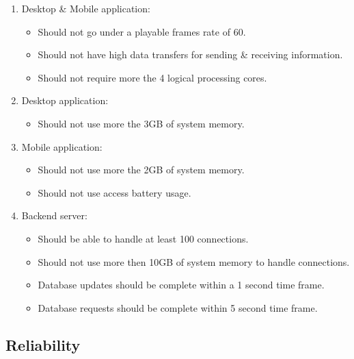 \documentclass[letterpaper]{article}
\begin{document}
			\begin{enumerate}
				\item Desktop \& Mobile application:
					\begin{itemize}
						\item Should not go under a playable frames rate of 60.
						\item Should not have high data transfers for sending \& receiving information.
						\item Should not require more the 4 logical processing cores.
					\end{itemize}
			
				\item Desktop application:
					\begin{itemize}
						\item Should not use more the 3GB of system memory.
					\end{itemize}
			
				\item Mobile application:
					\begin{itemize}
						\item Should not use more the 2GB of system memory.
						\item Should not use access battery usage.
					\end{itemize}
					
				\item Backend server:
					\begin{itemize}
						\item Should be able to handle at least 100 connections.
						\item Should not use more then 10GB of system memory to handle connections.
						\item Database updates should be complete within a 1 second time frame.
						\item Database requests should be complete within 5 second time frame.
					\end{itemize}
			\end{enumerate}
			
			\subsection*{Reliability}
			\vspace{0.1in}
			
\end{document}
